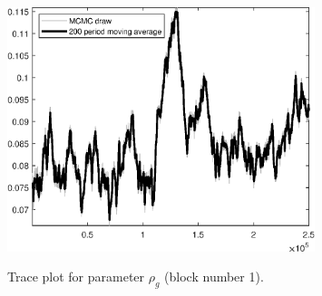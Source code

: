 \begin{figure}[H]
\centering
  \includegraphics[width=0.8\textwidth]{BRS_growth_ext_fd_v1/graphs/TracePlot_rho_g_blck_1}\\
    \caption{Trace plot for parameter ${\rho_g}$ (block number 1).}
\end{figure}
